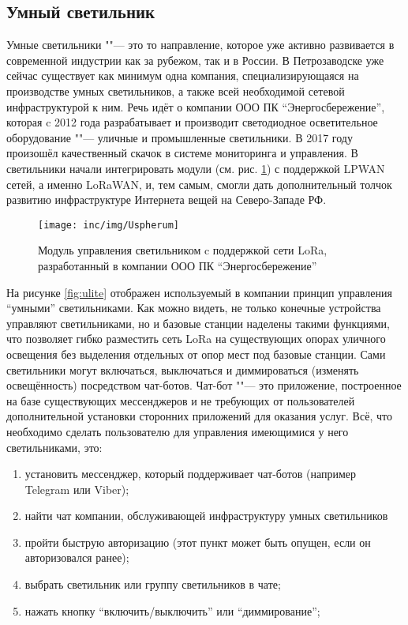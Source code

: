 \subsection{Умный светильник}

Умные светильники ""--- это то направление, которое уже активно развивается в современной индустрии как за рубежом, так и в России.
В Петрозаводске уже сейчас существует как минимум одна компания, специализирующаяся на производстве умных светильников, а также всей необходимой сетевой инфраструктурой к ним. 
Речь идёт о компании ООО ПК ``Энергосбережение'', которая c 2012 года 
разрабатывает и производит светодиодное осветительное оборудование ""--- уличные 
и промышленные светильники.
В 2017 году произошёл качественный скачок в системе мониторинга и управления.
В светильники начали интегрировать модули (см. рис. \ref{fig:uspherum}) с 
поддержкой LPWAN сетей, а именно LoRaWAN, и, тем самым, смогли дать 
дополнительный толчок развитию инфраструктуре Интернета вещей на Северо-Западе 
РФ.

\begin{figure}[!h]
  \centering
  \texttt{[image: inc/img/Uspherum]}
  \caption{Модуль управления светильником c поддержкой сети LoRa, разработанный в компании ООО ПК ``Энергосбережение'' \cite{isbergsite}}
  \label{fig:uspherum}
\end{figure}

На рисунке \ref{fig:ulite} отображен используемый в компании принцип управления ``умными'' светильниками. 
Как можно видеть, не только конечные устройства управляют светильниками, но и базовые станции наделены такими функциями, что позволяет гибко разместить сеть LoRa на существующих опорах уличного освещения без выделения отдельных от опор мест под базовые станции.
Сами светильники могут включаться, выключаться и диммироваться (изменять освещённость) посредством чат-ботов. 
Чат-бот ""--- это приложение, построенное на базе существующих мессенджеров и не требующих от пользователей дополнительной установки сторонних приложений для оказания услуг.
Всё, что необходимо сделать пользователю для управления имеющимися у него светильниками, это:
\begin{enumerate}
 \item установить мессенджер, который поддерживает чат-ботов (например Telegram или Viber);
 \item найти чат компании, обслуживающей инфраструктуру умных светильников
 \item пройти быструю авторизацию (этот пункт может быть опущен, если он авторизовался ранее);
 \item выбрать светильник или группу светильников в чате;
 \item нажать кнопку ``включить/выключить'' или ``диммирование'';
\end{enumerate}


